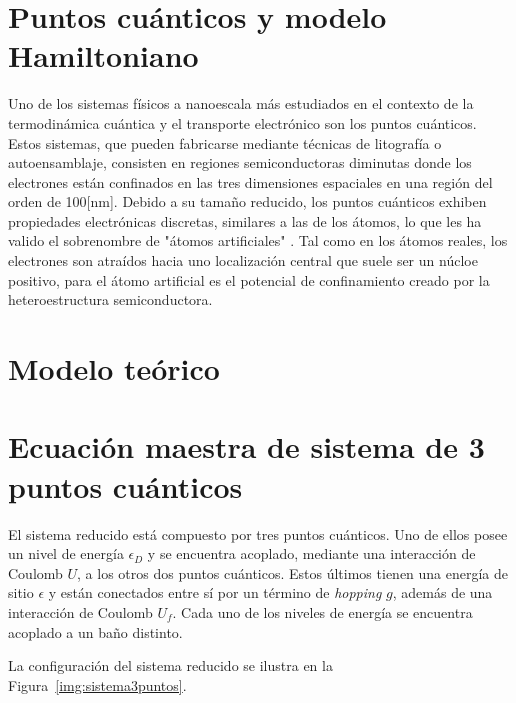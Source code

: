 \section{Puntos cuánticos y modelo Hamiltoniano}
Uno de los sistemas físicos a nanoescala más estudiados en el contexto de la termodinámica cuántica y el transporte electrónico son los puntos cuánticos. Estos sistemas, que pueden fabricarse mediante técnicas de litografía o autoensamblaje, consisten en regiones semiconductoras diminutas donde los electrones están confinados en las tres dimensiones espaciales en una región del orden de 100[nm]\cite{hanson2007spins}. Debido a su tamaño reducido, los puntos cuánticos exhiben propiedades electrónicas discretas, similares a las de los átomos, lo que les ha valido el sobrenombre de "átomos artificiales" \cite{kouwenhoven2001few}. Tal como en los átomos reales, los electrones son atraídos hacia uno localización central que suele ser un núcloe positivo, para el átomo artificial es el potencial de confinamiento creado por la heteroestructura semiconductora\cite{ashoori1996electrons}.


\section{Modelo teórico}

\section{Ecuación maestra de sistema de 3 puntos cuánticos}



El sistema reducido está compuesto por tres puntos cuánticos. Uno de ellos posee un nivel de energía $\epsilon_D$ y se encuentra acoplado, mediante una interacción de Coulomb $U$, a los otros dos puntos cuánticos. Estos últimos tienen una energía de sitio $\epsilon$ y están conectados entre sí por un término de \textit{hopping} $g$, además de una interacción de Coulomb $U_f$. Cada uno de los niveles de energía se encuentra acoplado a un baño distinto. 

La configuración del sistema reducido se ilustra en la Figura~\ref{img:sistema3puntos}.


